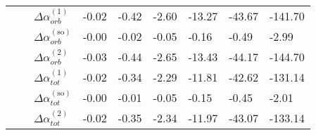 \begin{longtable}{lllllllll}
      &         & $\Delta \alpha_{orb}^{(\text{1})}$ &           -0.02 &         -0.42 &        -2.60 &         -13.27 &        -43.67 &      -141.70 \\
      &         & $\Delta \alpha_{orb}^{(\text{so})}$ &           -0.00 &         -0.02 &        -0.05 &          -0.16 &         -0.49 &        -2.99 \\
      &         & $\Delta \alpha_{orb}^{(\text{2})}$ &           -0.03 &         -0.44 &        -2.65 &         -13.43 &        -44.17 &      -144.70 \\
      &         & $\Delta \alpha_{tot}^{(\text{1})}$ &           -0.02 &         -0.34 &        -2.29 &         -11.81 &        -42.62 &      -131.14 \\
      &         & $\Delta \alpha_{tot}^{(\text{so})}$ &           -0.00 &         -0.01 &        -0.05 &          -0.15 &         -0.45 &        -2.01 \\
      &         & $\Delta \alpha_{tot}^{(\text{2})}$ &           -0.02 &         -0.35 &        -2.34 &         -11.97 &        -43.07 &      -133.14 \\
\end{longtable}
